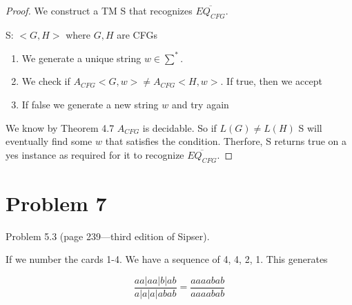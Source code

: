 \documentclass[11pt]{article}
\begin{document}
\begin{proof}


We construct a TM S that recognizes $\overline{EQ_{CFG}}$. 

S: $<G,H>$ where $G, H$ are CFGs
\begin{enumerate}[1.]
	\item We generate a unique string $w \in \sum^*$.
	\item We check if $A_{CFG}<G, w> \neq A_{CFG}<H,w>$. If true, then we accept
	\item If false we generate a new string $w$ and try again
\end{enumerate}

We know by Theorem 4.7 $A_{CFG}$ is decidable. So if $L(G) \neq L(H)$ S will eventually find some $w$ that satisfies the condition. Therfore, S returns true on a yes instance as required for it to recognize $\overline{EQ_{CFG}}$.

\end{proof}


\newpage
\section*{Problem 7}

Problem 5.3 (page 239---third edition of Sipser).
\newline

If we number the cards 1-4. We have a sequence of 4, 4, 2, 1. This generates

$$\frac{aa | aa | b | ab}{a | a | a | abab} = \frac{aaaabab}{aaaabab}$$
\end{document}
